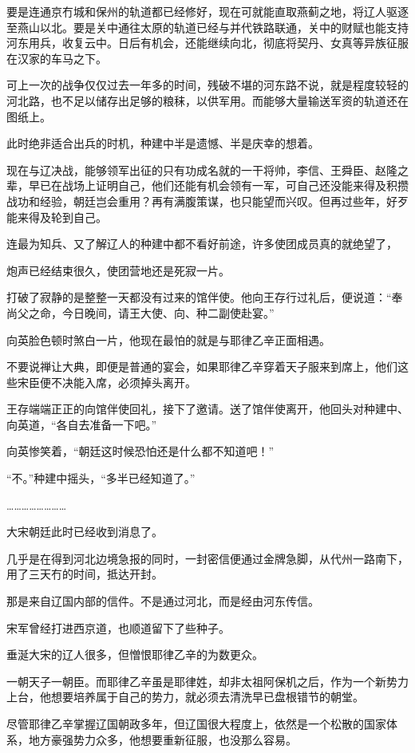 要是连通京冇城和保州的轨道都已经修好，现在可就能直取燕蓟之地，将辽人驱逐至燕山以北。要是关中通往太原的轨道已经与并代铁路联通，关中的财赋也能支持河东用兵，收复云中。日后有机会，还能继续向北，彻底将契丹、女真等异族征服在汉家的车马之下。

可上一次的战争仅仅过去一年多的时间，残破不堪的河东路不说，就是程度较轻的河北路，也不足以储存出足够的粮秣，以供军用。而能够大量输送军资的轨道还在图纸上。

此时绝非适合出兵的时机，种建中半是遗憾、半是庆幸的想着。

现在与辽决战，能够领军出征的只有功成名就的一干将帅，李信、王舜臣、赵隆之辈，早已在战场上证明自己，他们还能有机会领有一军，可自己还没能来得及积攒战功和经验，朝廷岂会重用？再有满腹策谋，也只能望而兴叹。但再过些年，好歹能来得及轮到自己。

连最为知兵、又了解辽人的种建中都不看好前途，许多使团成员真的就绝望了，

炮声已经结束很久，使团营地还是死寂一片。

打破了寂静的是整整一天都没有过来的馆伴使。他向王存行过礼后，便说道：“奉尚父之命，今日晚间，请王大使、向、种二副使赴宴。”

向英脸色顿时煞白一片，他现在最怕的就是与耶律乙辛正面相遇。

不要说禅让大典，即便是普通的宴会，如果耶律乙辛穿着天子服来到席上，他们这些宋臣便不决能入席，必须掉头离开。

王存端端正正的向馆伴使回礼，接下了邀请。送了馆伴使离开，他回头对种建中、向英道，“各自去准备一下吧。”

向英惨笑着，“朝廷这时候恐怕还是什么都不知道吧！”

“不。”种建中摇头，“多半已经知道了。”

……………………

大宋朝廷此时已经收到消息了。

几乎是在得到河北边境急报的同时，一封密信便通过金牌急脚，从代州一路南下，用了三天冇的时间，抵达开封。

那是来自辽国内部的信件。不是通过河北，而是经由河东传信。

宋军曾经打进西京道，也顺道留下了些种子。

垂涎大宋的辽人很多，但憎恨耶律乙辛的为数更众。

一朝天子一朝臣。而耶律乙辛虽是耶律姓，却非太祖阿保机之后，作为一个新势力上台，他想要培养属于自己的势力，就必须去清洗早已盘根错节的朝堂。

尽管耶律乙辛掌握辽国朝政多年，但辽国很大程度上，依然是一个松散的国家体系，地方豪强势力众多，他想要重新征服，也没那么容易。

